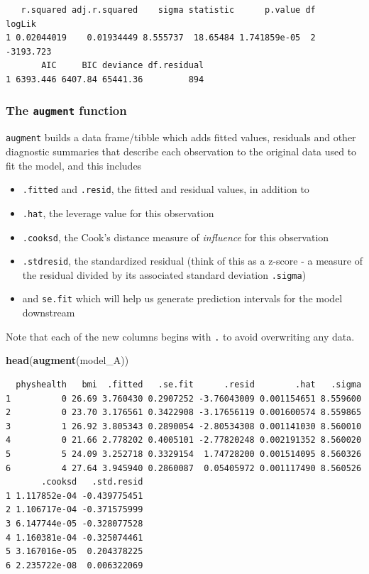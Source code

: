 \documentclass[]{book}
\newenvironment{Shaded}{\begin{snugshade}}{\end{snugshade}}
\newcommand{\KeywordTok}[1]{\textcolor[rgb]{0.13,0.29,0.53}{\textbf{#1}}}
\newcommand{\NormalTok}[1]{#1}
\providecommand{\tightlist}{%
  \setlength{\itemsep}{0pt}\setlength{\parskip}{0pt}}
\theoremstyle{definition}
\theoremstyle{definition}
\theoremstyle{definition}
\theoremstyle{remark}
\begin{document}
\begin{verbatim}
   r.squared adj.r.squared    sigma statistic      p.value df    logLik
1 0.02044019    0.01934449 8.555737  18.65484 1.741859e-05  2 -3193.723
       AIC     BIC deviance df.residual
1 6393.446 6407.84 65441.36         894
\end{verbatim}

\subsubsection{\texorpdfstring{The \texttt{augment}
function}{The augment function}}\label{the-augment-function}

\texttt{augment} builds a data frame/tibble which adds fitted values,
residuals and other diagnostic summaries that describe each observation
to the original data used to fit the model, and this includes

\begin{itemize}
\tightlist
\item
  \texttt{.fitted} and \texttt{.resid}, the fitted and residual values,
  in addition to
\item
  \texttt{.hat}, the leverage value for this observation
\item
  \texttt{.cooksd}, the Cook's distance measure of \emph{influence} for
  this observation
\item
  \texttt{.stdresid}, the standardized residual (think of this as a
  z-score - a measure of the residual divided by its associated standard
  deviation \texttt{.sigma})
\item
  and \texttt{se.fit} which will help us generate prediction intervals
  for the model downstream
\end{itemize}

Note that each of the new columns begins with \texttt{.} to avoid
overwriting any data.

\begin{Shaded}
\begin{Highlighting}[]
\KeywordTok{head}\NormalTok{(}\KeywordTok{augment}\NormalTok{(model_A))}
\end{Highlighting}
\end{Shaded}

\begin{verbatim}
  physhealth   bmi  .fitted   .se.fit      .resid        .hat   .sigma
1          0 26.69 3.760430 0.2907252 -3.76043009 0.001154651 8.559600
2          0 23.70 3.176561 0.3422908 -3.17656119 0.001600574 8.559865
3          1 26.92 3.805343 0.2890054 -2.80534308 0.001141030 8.560010
4          0 21.66 2.778202 0.4005101 -2.77820248 0.002191352 8.560020
5          5 24.09 3.252718 0.3329154  1.74728200 0.001514095 8.560326
6          4 27.64 3.945940 0.2860087  0.05405972 0.001117490 8.560526
       .cooksd   .std.resid
1 1.117852e-04 -0.439775451
2 1.106717e-04 -0.371575999
3 6.147744e-05 -0.328077528
4 1.160381e-04 -0.325074461
5 3.167016e-05  0.204378225
6 2.235722e-08  0.006322069
\end{verbatim}
\end{document}
